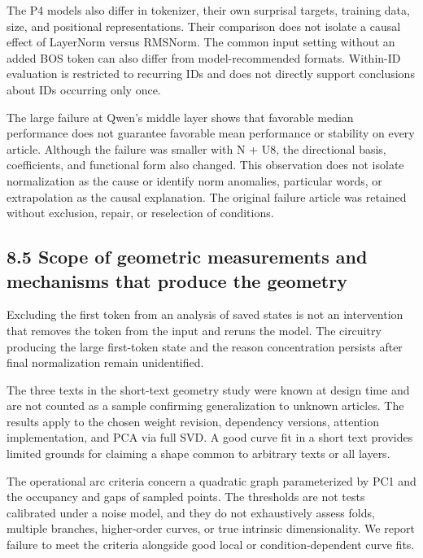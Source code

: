 The P4 models also differ in tokenizer, their own surprisal targets, training data, size, and positional representations. Their comparison does not isolate a causal effect of LayerNorm versus RMSNorm. The common input setting without an added BOS token can also differ from model-recommended formats. Within-ID evaluation is restricted to recurring IDs and does not directly support conclusions about IDs occurring only once.

The large failure at Qwen's middle layer shows that favorable median performance does not guarantee favorable mean performance or stability on every article. Although the failure was smaller with N + U8, the directional basis, coefficients, and functional form also changed. This observation does not isolate normalization as the cause or identify norm anomalies, particular words, or extrapolation as the causal explanation. The original failure article was retained without exclusion, repair, or reselection of conditions.

\FloatBarrier

\subsection{8.5 Scope of geometric measurements and mechanisms that produce the geometry}\label{scope-of-geometric-measurements-and-mechanisms-that-produce-the-geometry}

Excluding the first token from an analysis of saved states is not an intervention that removes the token from the input and reruns the model. The circuitry producing the large first-token state and the reason concentration persists after final normalization remain unidentified.

The three texts in the short-text geometry study were known at design time and are not counted as a sample confirming generalization to unknown articles. The results apply to the chosen weight revision, dependency versions, attention implementation, and PCA via full SVD. A good curve fit in a short text provides limited grounds for claiming a shape common to arbitrary texts or all layers.

The operational arc criteria concern a quadratic graph parameterized by PC1 and the occupancy and gaps of sampled points. The thresholds are not tests calibrated under a noise model, and they do not exhaustively assess folds, multiple branches, higher-order curves, or true intrinsic dimensionality. We report failure to meet the criteria alongside good local or condition-dependent curve fits.

